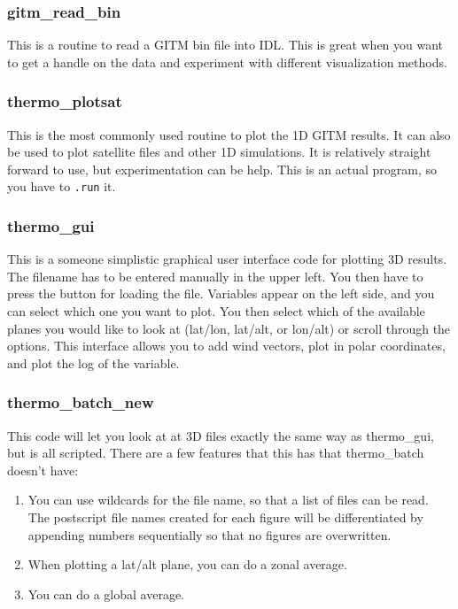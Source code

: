 \subsubsection{gitm\_read\_bin}

This is a routine to read a GITM bin file into IDL.  This is great when you want to get a handle on the data and experiment with different visualization methods.

\subsubsection{thermo\_plotsat}

This is the most commonly used routine to plot the 1D GITM results.  It can also be used to plot satellite files and other 1D simulations.  It is relatively straight forward to use, but experimentation can be help.  This is an actual program, so you have to {\tt .run} it.

\subsubsection{thermo\_gui}

This is a someone simplistic graphical user interface code for plotting 3D results.  The filename has to be entered manually in the upper left.  You then have to press the button for loading the file.  Variables appear on the left side, and you can select which one you want to plot.  You then select which of the available planes you would like to look at (lat/lon, lat/alt, or lon/alt) or scroll through the options.  This interface allows you to add wind vectors, plot in polar coordinates, and plot the log of the variable.

\subsubsection{thermo\_batch\_new}

This code will let you look at at 3D files exactly the same way as thermo\_gui, but is all scripted.  There are a few features that this has that thermo\_batch doesn't have:

\begin{enumerate}
	\item You can use wildcards for the file name, so that a list of files can be read.  The postscript file names created for each figure will be differentiated by appending numbers sequentially so that no figures are overwritten.
	\item When plotting a lat/alt plane, you can do a zonal average. 
	\item You can do a global average.
\end{enumerate}

